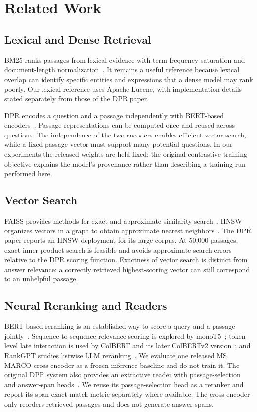 \section{Related Work}
\subsection{Lexical and Dense Retrieval}
BM25 ranks passages from lexical evidence with term-frequency saturation and document-length normalization~\cite{bm25}. It remains a useful reference because lexical overlap can identify specific entities and expressions that a dense model may rank poorly. Our lexical reference uses Apache Lucene, with implementation details stated separately from those of the DPR paper.

DPR encodes a question and a passage independently with BERT-based encoders~\cite{dpr,bert}. Passage representations can be computed once and reused across questions. The independence of the two encoders enables efficient vector search, while a fixed passage vector must support many potential questions. In our experiments the released weights are held fixed; the original contrastive training objective explains the model's provenance rather than describing a training run performed here.

\subsection{Vector Search}
FAISS provides methods for exact and approximate similarity search~\cite{faiss}. HNSW organizes vectors in a graph to obtain approximate nearest neighbors~\cite{hnsw}. The DPR paper reports an HNSW deployment for its large corpus. At 50,000 passages, exact inner-product search is feasible and avoids approximate-search errors relative to the DPR scoring function. Exactness of vector search is distinct from answer relevance: a correctly retrieved highest-scoring vector can still correspond to an unhelpful passage.

\subsection{Neural Reranking and Readers}
BERT-based reranking is an established way to score a query and a passage jointly~\cite{nogueira,bert}. Sequence-to-sequence relevance scoring is explored by monoT5~\cite{monot5}; token-level late interaction is used by ColBERT and its later ColBERTv2 version~\cite{colbert,colbertv2}; and RankGPT studies listwise LLM reranking~\cite{rankgpt}. We evaluate one released MS MARCO cross-encoder as a frozen inference baseline and do not train it. The original DPR system also provides an extractive reader with passage-selection and answer-span heads~\cite{dprcode}. We reuse its passage-selection head as a reranker and report its span exact-match metric separately where available. The cross-encoder only reorders retrieved passages and does not generate answer spans.

